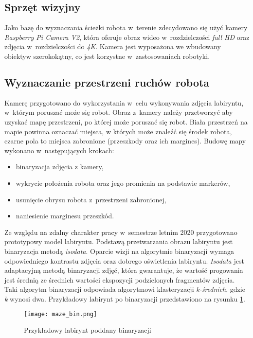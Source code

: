 \subsection{Sprzęt wizyjny}
Jako bazę do wyznaczania ścieżki robota w~terenie zdecydowano się użyć kamery
\textit{Raspberry Pi Camera V2}, która oferuje obraz wideo w~rozdzielczości
\textit{full HD} oraz zdjęcia w~rozdzielczości do \textit{4K}.
Kamera jest wyposażona we wbudowany obiektyw szerokokątny, co jest korzystne
w~zastosowaniach robotyki.

\subsection{Wyznaczanie przestrzeni ruchów robota}
Kamerę przygotowano do wykorzystania w~celu wykonywania zdjęcia labiryntu,
w~którym poruszać może się robot.
Obraz z~kamery należy przetworzyć aby uzyskać mapę przestrzeni, po której może
poruszać się robot.
Biała przestrzeń na mapie powinna oznaczać miejsca, w których może znaleźć się 
środek robota, czarne pola to miejsca zabronione (przeszkody oraz ich
margines).
Budowę mapy wykonano w~następujących krokach:
\begin{itemize}
	\item binaryzacja zdjęcia z kamery,
	\item wykrycie położenia robota oraz jego promienia na podstawie markerów,
	\item usunięcie obrysu robota z~przestrzeni zabronionej, 
	\item naniesienie marginesu przeszkód.
\end{itemize}

Ze względu na zdalny charakter pracy w~semestrze letnim 2020 przygotowano
prototypowy model labiryntu.
Podstawą przetwarzania obrazu labiryntu jest binaryzacja metodą
\textit{isodata}.
Oparcie wizji na algorytmie binaryzacji wymaga odpowiedniego kontrastu zdjęcia
oraz dobrego oświetlenia labiryntu.
\textit{Isodata} jest adaptacyjną metodą binaryzacji zdjęć, która gwarantuje,
że wartość progowania jest średnią ze średnich wartości ekspozycji podzielonych
fragmentów zdjęcia.
Taki algorytm binaryzacji odpowiada algorytmowi klasteryzacji
\textit{k-średnich}, gdzie \textit{k} wynosi dwa.
Przykładowy labirynt po binaryzacji przedstawiono na rysunku
\ref{fig:maze_bin}.
\begin{figure}
\centering
\texttt{[image: maze\_bin.png]}
\caption{Przykładowy labirynt poddany binaryzacji}
\label{fig:maze_bin}
\end{figure}

